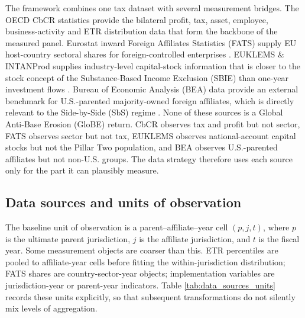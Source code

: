 \documentclass[11pt,a4paper]{article}
\begin{document}
The framework combines one tax dataset with several measurement bridges. The OECD CbCR statistics provide the bilateral profit, tax, asset, employee, business-activity and ETR distribution data that form the backbone of the measured panel. Eurostat inward Foreign Affiliates Statistics (FATS) supply EU host-country sectoral shares for foreign-controlled enterprises \citep{eurostat2025fats}. EUKLEMS \& INTANProd supplies industry-level capital-stock information that is closer to the stock concept of the Substance-Based Income Exclusion (SBIE) than one-year investment flows \citep{euklemsintanprod2025}. Bureau of Economic Analysis (BEA) data provide an external benchmark for U.S.-parented majority-owned foreign affiliates, which is directly relevant to the Side-by-Side (SbS) regime \citep{bea2025usmne}. None of these sources is a Global Anti-Base Erosion (GloBE) return. CbCR observes tax and profit but not sector, FATS observes sector but not tax, EUKLEMS observes national-account capital stocks but not the Pillar Two population, and BEA observes U.S.-parented affiliates but not non-U.S. groups. The data strategy therefore uses each source only for the part it can plausibly measure.

\subsection{Data sources and units of observation}\label{sec:data_sources_units}

The baseline unit of observation is a parent--affiliate--year cell $(p,j,t)$, where $p$ is the ultimate parent jurisdiction, $j$ is the affiliate jurisdiction, and $t$ is the fiscal year. Some measurement objects are coarser than this. ETR percentiles are pooled to affiliate-year cells before fitting the within-jurisdiction distribution; FATS shares are country-sector-year objects; implementation variables are jurisdiction-year or parent-year indicators. Table \ref{tab:data_sources_units} records these units explicitly, so that subsequent transformations do not silently mix levels of aggregation.
\end{document}
